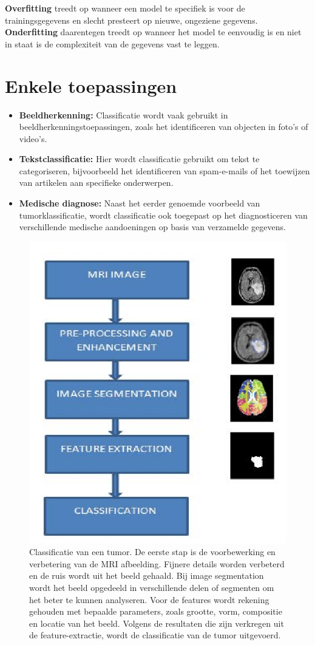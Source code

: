 \documentclass[TeamE-eindrapport]{subfiles}
\begin{document}
	\textbf{Overfitting} treedt op wanneer een model te specifiek is voor de trainingsgegevens en slecht presteert op nieuwe, ongeziene gegevens. \textbf{Onderfitting} daarentegen treedt op wanneer het model te eenvoudig is en niet in staat is de complexiteit van de gegevens vast te leggen.
	
	
	\section{Enkele toepassingen}
	\begin{itemize}
		\item \textbf{Beeldherkenning:} Classificatie wordt vaak gebruikt in beeldherkenningstoepassingen, zoals het identificeren van objecten in foto's of video's.
		
		\item \textbf{Tekstclassificatie:} Hier wordt classificatie gebruikt om tekst te categoriseren, bijvoorbeeld het identificeren van spam-e-mails of het toewijzen van artikelen aan specifieke onderwerpen.
		
		\item \textbf{Medische diagnose:} Naast het eerder genoemde voorbeeld van tumorklassificatie, wordt classificatie ook toegepast op het diagnosticeren van verschillende medische aandoeningen op basis van verzamelde gegevens.
		
	\end{itemize}
	
	
	\begin{figure}
		\centering
		\includegraphics[width=.5\textwidth]{tumor}
		\caption{Classificatie van een tumor. De eerste stap is de voorbewerking en verbetering van de MRI afbeelding. Fijnere details worden verbeterd en de ruis wordt uit het beeld gehaald. Bij image segmentation wordt het beeld opgedeeld in verschillende delen of segmenten om het beter te kunnen analyseren. Voor de features wordt rekening gehouden met bepaalde parameters, zoals grootte, vorm, compositie en locatie van het beeld. Volgens de resultaten die zijn verkregen uit de feature-extractie, wordt de classificatie van de tumor uitgevoerd.}
	\end{figure}
	
\end{document}
